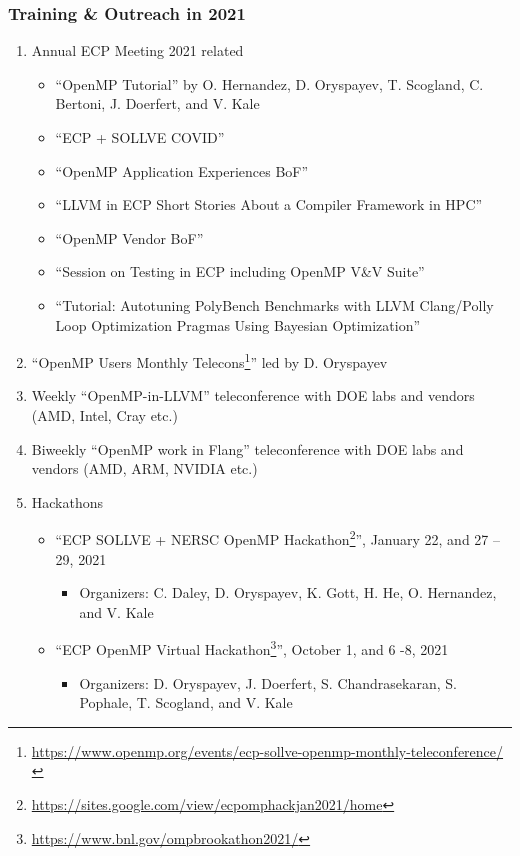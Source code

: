\subsubsection{ Training \& Outreach in 2021}\label{subsubsect:train_outreach}

\begin{enumerate}
\item Annual ECP Meeting 2021 related
\begin{itemize}
    \item \enquote{OpenMP Tutorial} by O. Hernandez, D. Oryspayev, T. Scogland, C. Bertoni, J. Doerfert, and V. Kale
    \item \enquote{ECP + SOLLVE COVID} 
    \item \enquote{OpenMP Application Experiences BoF} 
    \item \enquote{LLVM in ECP Short Stories About a Compiler Framework in HPC} 
    \item \enquote{OpenMP Vendor BoF}
    \item \enquote{Session on Testing in ECP including OpenMP V\&V Suite} 
    \item \enquote{Tutorial: Autotuning PolyBench Benchmarks with LLVM Clang/Polly Loop Optimization Pragmas Using Bayesian Optimization}
\end{itemize}

\item \enquote{OpenMP Users Monthly Telecons\footnote{\url{https://www.openmp.org/events/ecp-sollve-openmp-monthly-teleconference/}}} led by D. Oryspayev

\item Weekly \enquote{OpenMP-in-LLVM} teleconference with DOE labs and vendors (AMD, Intel, Cray etc.)

\item Biweekly \enquote{OpenMP work in Flang} teleconference with DOE labs and vendors (AMD, ARM, NVIDIA etc.)

\item Hackathons

\begin{itemize}
    \item \enquote{ECP SOLLVE + NERSC OpenMP Hackathon\footnote{\url{https://sites.google.com/view/ecpomphackjan2021/home}}}, January 22, and 27 – 29, 2021
    \begin{itemize}
        \item Organizers: C. Daley, D. Oryspayev, K. Gott, H. He, O. Hernandez, and V. Kale 
    \end{itemize}
    \item \enquote{ECP OpenMP Virtual Hackathon\footnote{\url{https://www.bnl.gov/ompbrookathon2021/}}}, October 1, and 6 -8, 2021
    \begin{itemize}
        \item Organizers: D. Oryspayev, J. Doerfert, S. Chandrasekaran, S. Pophale, T. Scogland, and V. Kale  
    \end{itemize}
\end{itemize}


\end{enumerate}
